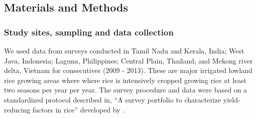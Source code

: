 \subsection{Materials and Methods}

\subsubsection{Study sites, sampling and data collection}
We used data from surveys conducted in Tamil Nadu  and Kerala, India; West Java, Indonesia; Laguna, Philippines; Central Plain, Thailand; and Mekong river delta, Vietnam for consecutives (2009 - 2013). These are major irrigated lowland rice growing areas where where rice is intensively cropped growing rice at least two seasons per year per year. The survey procedure and data were based on a standardized protocol described  in, ``A survey portfolio to characterize yield-reducing factors in rice'' developed by \citet{Savarysurvey2009}.